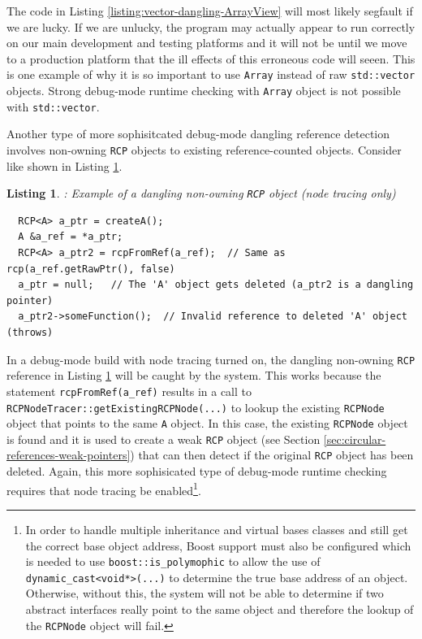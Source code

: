 \documentclass[pdf,ps2pdf,11pt]{SANDreport}
\newtheorem{listing}{Listing}
\begin{document}
The code in Listing {}\ref{listing:vector-dangling-ArrayView} will
most likely segfault if we are lucky.  If we are unlucky, the program
may actually appear to run correctly on our main development and
testing platforms and it will not be until we move to a production
platform that the ill effects of this erroneous code will seeen.  This
is one example of why it is so important to use {}\texttt{Array}
instead of raw {}\texttt{std::vector} objects.  Strong debug-mode
runtime checking with {}\texttt{Array} object is not possible with
{}\texttt{std::vector}.

Another type of more sophisitcated debug-mode dangling reference
detection involves non-owning {}\texttt{RCP} objects to existing
reference-counted objects.  Consider like shown in Listing
{}\ref{listing:RCP-nonowning-dangling-ref}.

\begin{listing}: Example of a dangling non-owning {}\texttt{RCP} object
(node tracing only) \\
\label{listing:RCP-nonowning-dangling-ref}
{\small\begin{verbatim}
  RCP<A> a_ptr = createA();
  A &a_ref = *a_ptr;
  RCP<A> a_ptr2 = rcpFromRef(a_ref);  // Same as rcp(a_ref.getRawPtr(), false)
  a_ptr = null;   // The 'A' object gets deleted (a_ptr2 is a dangling pointer)
  a_ptr2->someFunction();  // Invalid reference to deleted 'A' object (throws)
\end{verbatim}}
\end{listing}

In a debug-mode build with node tracing turned on, the dangling
non-owning {}\texttt{RCP} reference in Listing
{}\ref{listing:RCP-nonowning-dangling-ref} will be caught by the
system.  This works because the statement
{}\texttt{rcpFromRef(a\_ref)} results in a call to
{}\texttt{RCPNodeTracer::getExistingRCPNode(...)} to lookup the
existing {}\texttt{RCPNode} object that points to the same
{}\texttt{A} object.  In this case, the existing {}\texttt{RCPNode}
object is found and it is used to create a weak {}\texttt{RCP} object
(see Section {}\ref{sec:circular-references-weak-pointers}) that can
then detect if the original {}\texttt{RCP} object has been deleted.
Again, this more sophisicated type of debug-mode runtime checking
requires that node tracing be enabled\footnote{In order to handle
multiple inheritance and virtual bases classes and still get the
correct base object address, Boost support must also be configured
which is needed to use {}\texttt{boost::is\_polymophic} to allow the
use of {}\texttt{dynamic\_cast<void*>(...)} to determine the true base
address of an object.  Otherwise, without this, the system will not be
able to determine if two abstract interfaces really point to the same
object and therefore the lookup of the {}\texttt{RCPNode} object will
fail.}.
\end{document}
